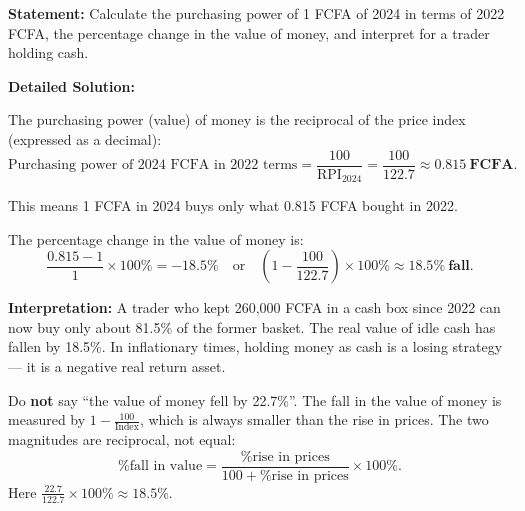 \documentclass[11pt]{article}
\newcommand{\cle}[1]{{\popxbold\color{popdark}#1}}
\begin{document}
\begin{exoresolu}
\textbf{Statement:} Calculate the purchasing power of 1 FCFA of 2024 in terms of 2022 FCFA, the percentage change in the value of money, and interpret for a trader holding cash.

\tcblower
\textbf{Detailed Solution:}

The purchasing power (value) of money is the reciprocal of the price index (expressed as a decimal):
\[
\text{Purchasing power of 2024 FCFA in 2022 terms} = \frac{100}{\text{RPI}_{2024}} = \frac{100}{122.7} \approx \mathbf{0.815\ FCFA}.
\]

This means 1 FCFA in 2024 buys only what 0.815 FCFA bought in 2022.

The percentage change in the value of money is:
\[
\frac{0.815 - 1}{1} \times 100\% = -18.5\% \quad \text{or} \quad \left(1 - \frac{100}{122.7}\right) \times 100\% \approx \mathbf{18.5\%\ fall}.
\]

\textbf{Interpretation:} A trader who kept 260,000 FCFA in a cash box since 2022 can now buy only about 81.5\% of the former basket. The real value of idle cash has fallen by 18.5\%. In inflationary times, holding money as cash is a losing strategy — it is a \cle{negative real return} asset.

\begin{attention}
Do \textbf{not} say ``the value of money fell by 22.7\%''. The fall in the value of money is measured by $1 - \frac{100}{\text{Index}}$, which is always smaller than the rise in prices. The two magnitudes are reciprocal, not equal:
\[
\text{\% fall in value} = \frac{\text{\% rise in prices}}{100 + \text{\% rise in prices}} \times 100\%.
\]
Here $\frac{22.7}{122.7} \times 100\% \approx 18.5\%$.
\end{attention}
\end{exoresolu}
\end{document}
